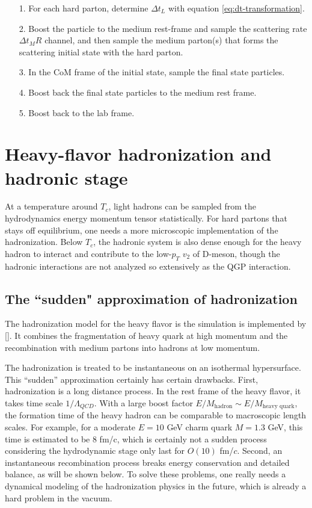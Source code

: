 \begin{itemize}
\item[1.] For each hard parton, determine $\Delta t_L$ with equation \ref{eq:dt-transformation}.
\item[2.] Boost the particle to the medium rest-frame and sample the scattering rate $\Delta t_M R$ channel, and then sample the medium parton(s) that forms the scattering initial state with the hard parton.
\item[3.] In the CoM frame of the initial state, sample the final state particles.
\item[4.] Boost back the final state particles to the medium rest frame.
\item[5.] Boost back to the lab frame.
\end{itemize}

\section{Heavy-flavor hadronization and hadronic stage}
At a temperature around $T_c$, light hadrons can be sampled from the hydrodynamics energy momentum tensor statistically.
For hard partons that stays off equilibrium, one needs a more microscopic implementation of the hadronization.
Below $T_c$, the hadronic system is also dense enough for the heavy hadron to interact and contribute to the low-$p_T$ $v_2$ of D-meson, though the hadronic interactions are not analyzed so extensively as the QGP interaction.

\subsection{The ``sudden" approximation of hadronization} 
The hadronization model for the heavy flavor is the simulation is implemented by [].
It combines the fragmentation of heavy quark at high momentum and the recombination with medium partons into hadrons at low momentum.

The hadronization is treated to be instantaneous on an isothermal hypersurface.
This ``sudden'' approximation certainly has certain drawbacks.
First, hadronization is a long distance process. 
In the rest frame of the heavy flavor, it takes time scale $1/\Lambda_{QCD}$. 
With a large boost factor $E/M_{\textrm{hadron}}\sim E/M_{\textrm{heavy quark}}$, the formation time of the heavy hadron can be comparable to macroscopic length scales.
For example, for a moderate $E=10$ GeV charm quark $M=1.3$ GeV, this time is estimated to be $8$ fm/c, which is certainly not a sudden process considering the hydrodynamic stage only last for $O(10)$ fm/$c$.
Second, an instantaneous recombination process breaks energy conservation and detailed balance, as will be shown below.
To solve these problems, one really needs a dynamical modeling of the hadronization physics in the future,
which is already a hard problem in the vacuum.

